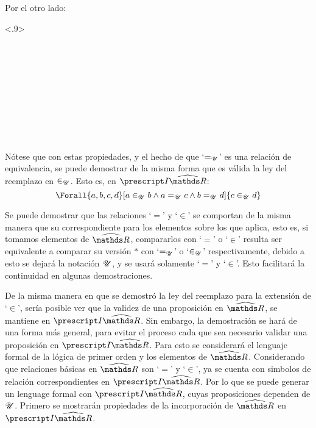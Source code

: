 \begin{demo}
  Por el otro lado:
  \begin{longderivation}<.9>
      \\
    \To\\
      \\
    \equiv\\
      \\
    \equiv\\
      \\
    \equiv\\
      \\
    \equiv\\
  \end{longderivation}
\end{demo}

Nótese que con estas propiedades, y el hecho de que `$=_{\mathscr{U}}$' es una
relación de equivalencia, se puede demostrar de la misma forma que
es válida la ley del reemplazo en $\in_{\mathscr{U}}$. Esto es, en $\IRh$:
\[\Forall{a,b,c,d}[a\inu b \land a\equ c \land b \equ d]{c\inu d}\]

Se puede demostrar que las relaciones `$=$' y `$\in$' se comportan de
la misma manera que su correspondiente para los elementos sobre los que
aplica, esto es, si tomamos elementos de $\Rh$, compararlos con `$=$' o
`$\in$' resulta ser equivalente a comparar su versión $*$ con `$=_{\mathscr{U}}$'
o `$\in_{\mathscr{U}}$' respectivamente, debido a esto se dejará la notación $\mathscr{U}$, y
se usará solamente `$=$' y `$\in$'. Esto facilitará la
continuidad en algunas demostraciones.

De la misma manera en que se demostró la ley del reemplazo para
la extensión de `$\in$', sería posible ver que la validez de una
proposición en $\Rh$, se mantiene en $\IRh$. Sin embargo, la
demostración se hará de una forma más general, para evitar el proceso
cada que sea necesario validar una proposición en $\IRh$. Para esto se
considerará el lenguaje formal de la lógica de primer orden y los
elementos de $\Rh$. Considerando que relaciones
básicas en $\Rh$ son `$=$' y `$\in$', ya se cuenta con simbolos de
relación correspondientes en $\IRh$. Por lo que se puede generar un
lenguage formal con $\IRh$, cuyas proposiciones dependen de $\mathscr{U}$.
Primero se mostrarán propiedades de la incorporación de $\Rh$ en $\IRh$.

